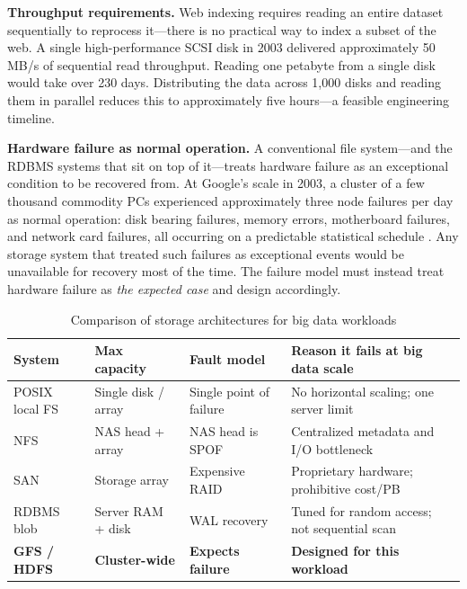 \textbf{Throughput requirements.} Web indexing requires reading an
entire dataset sequentially to reprocess it---there is no practical
way to index a subset of the web. A single high-performance SCSI disk
in 2003 delivered approximately 50 MB/s of sequential read throughput.
Reading one petabyte from a single disk would take over 230 days.
Distributing the data across 1,000 disks and reading them in parallel
reduces this to approximately five hours---a feasible engineering
timeline.

\textbf{Hardware failure as normal operation.} A conventional file
system---and the RDBMS systems that sit on top of it---treats hardware
failure as an exceptional condition to be recovered from. At Google's
scale in 2003, a cluster of a few thousand commodity PCs experienced
approximately three node failures per day as normal operation: disk
bearing failures, memory errors, motherboard failures, and network card
failures, all occurring on a predictable statistical schedule
\parencite{GFS2003}. Any storage system that treated such failures as
exceptional events would be unavailable for recovery most of the time.
The failure model must instead treat hardware failure as \emph{the
expected case} and design accordingly.

\begin{table}[h!t]
\centering
\caption{Comparison of storage architectures for big data workloads}
\label{tab:storage-comparison}
\renewcommand{\arraystretch}{1.4}
\begin{tabular}{L{2.0cm} L{2.4cm} L{2.4cm} L{4.0cm}}
\toprule
\textbf{System} & \textbf{Max capacity} & \textbf{Fault model} & \textbf{Reason it fails at big data scale} \\
\midrule
POSIX local FS  & Single disk / array & Single point of failure & No horizontal scaling; one server limit \\
NFS             & NAS head + array    & NAS head is SPOF       & Centralized metadata and I/O bottleneck \\
SAN             & Storage array       & Expensive RAID         & Proprietary hardware; prohibitive cost/PB \\
RDBMS blob      & Server RAM + disk   & WAL recovery           & Tuned for random access; not sequential scan \\
\textbf{GFS / HDFS} & \textbf{Cluster-wide} & \textbf{Expects failure} & \textbf{Designed for this workload} \\
\bottomrule
\end{tabular}
\end{table}

